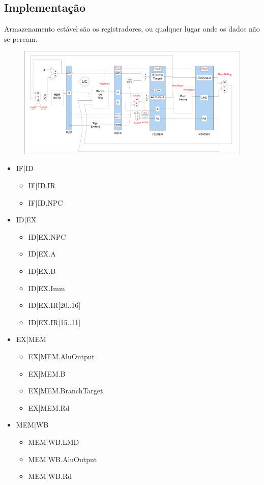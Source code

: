 \documentclass[a4paper]{article}
\begin{document}
\subsection{Implementação}

Armazenamento estável são os registradores, ou qualquer lugar onde os dados não se percam.

\begin{figure}[h]
        \includegraphics[width=13cm]{implementacao}
\end{figure}
\begin{itemize}
    \item IF|ID
        \begin{itemize}
            \item IF|ID.IR
            \item IF|ID.NPC
        \end{itemize}
    \item ID|EX
        \begin{itemize}
            \item ID|EX.NPC
            \item ID|EX.A
            \item ID|EX.B
            \item ID|EX.Imm
            \item ID|EX.IR[20..16]
            \item ID|EX.IR[15..11]
        \end{itemize}
    \item EX|MEM
        \begin{itemize}
            \item EX|MEM.AluOutput
            \item EX|MEM.B
            \item EX|MEM.BranchTarget
            \item EX|MEM.Rd
        \end{itemize}
    \item MEM|WB
        \begin{itemize}
            \item MEM|WB.LMD
            \item MEM|WB.AluOutput
            \item MEM|WB.Rd
        \end{itemize}
\end{itemize}
\end{document}
